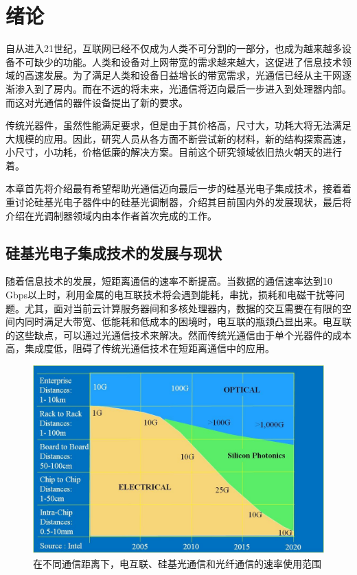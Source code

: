 \chapter{绪论}
自从进入21世纪，互联网已经不仅成为人类不可分割的一部分，也成为越来越多设备不可缺少的功能。人类和设备对上网带宽的需求越来越大，这促进了信息技术领域的高速发展。为了满足人类和设备日益增长的带宽需求，光通信已经从主干网逐渐渗入到了房内。而在不远的将未来，光通信将迈向最后一步进入到处理器内部。而这对光通信的器件设备提出了新的要求。


传统光器件，虽然性能满足要求，但是由于其价格高，尺寸大，功耗大将无法满足大规模的应用。因此，研究人员从各方面不断尝试新的材料，新的结构探索高速，小尺寸，小功耗，价格低廉的解决方案。目前这个研究领域依旧热火朝天的进行着。


本章首先将介绍最有希望帮助光通信迈向最后一步的硅基光电子集成技术，接着着重讨论硅基光电子器件中的硅基光调制器，介绍其目前国内外的发展现状，最后将介绍在光调制器领域内由本作者首次完成的工作。


\section{硅基光电子集成技术的发展与现状}
随着信息技术的发展，短距离通信的速率不断提高。当数据的通信速率达到10 Gbps以上时，利用金属的电互联技术将会遇到能耗，串扰，损耗和电磁干扰等问题。尤其，面对当前云计算服务器间和多核处理器内，数据的交互需要在有限的空间内同时满足大带宽、低能耗和低成本的困境时，电互联的瓶颈凸显出来。电互联的这些缺点，可以通过光通信技术来解决。然而传统光通信由于单个光器件的成本高，集成度低，阻碍了传统光通信技术在短距离通信中的应用。

\begin{figure}[htb]
	\centering
	\includegraphics[width=12cm]{./Pictures/figure1.jpg}
	\caption{在不同通信距离下，电互联、硅基光通信和光纤通信的速率使用范围 \cite{Zuffada2012}}
	\label{figure1}
\end{figure}

